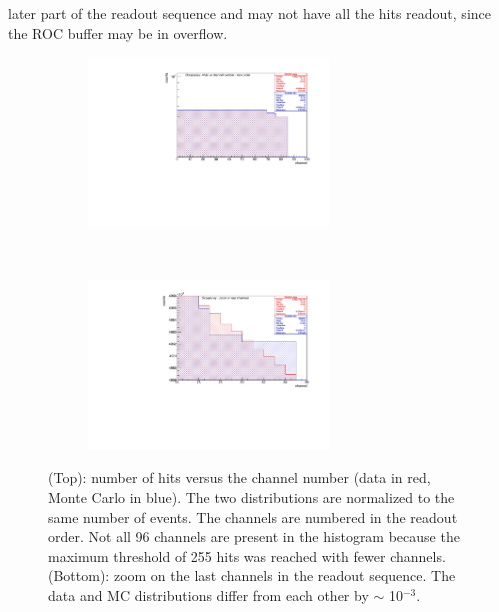 later part of the readout sequence and may not have all the hits readout, 
since the ROC buffer may be in overflow.
  \begin{figure}[!h]
    \begin{subfigure}[b]{\textwidth}
        \centering
        \includegraphics[width=0.7\textwidth]{figures/pdf/figure_00004_nhitsvschannel_roc_simulation_281.pdf}
        \label{fig:tt1}
    \end{subfigure}
  \\
    \begin{subfigure}[b]{\textwidth}
        \centering
        \includegraphics[width=0.7\textwidth]{figures/pdf/figure_00014_nhitsvschannel_roc_simulation_281.pdf}
        \label{fig:tt2}
    \end{subfigure}
       \caption{(Top): number of hits versus the channel number 
       (data in red, Monte Carlo in blue). The two distributions 
       are normalized to the same number of events.
       The channels are numbered in the readout order. Not all 96 channels 
       are present in the histogram 
       because the maximum threshold of 255 hits was reached with fewer channels.
       (Bottom): zoom on the last channels in the readout sequence. The data 
       and MC distributions differ from each other by $\sim$ 10$^{-3}$.}
       \label{fig:2}
  \end{figure}


